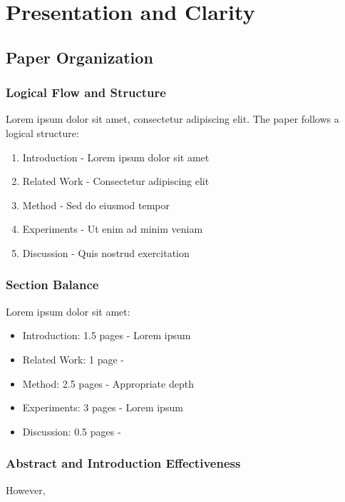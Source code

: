\section*{Presentation and Clarity}
\label{sec:presentation_clarity}

\subsection{Paper Organization}
\subsubsection{Logical Flow and Structure}
Lorem ipsum dolor sit amet, consectetur adipiscing elit. The paper follows a logical structure:
\begin{enumerate}
    \item Introduction - Lorem ipsum dolor sit amet
    \item Related Work - Consectetur adipiscing elit
    \item Method - Sed do eiusmod tempor
    \item Experiments - Ut enim ad minim veniam
    \item Discussion - Quis nostrud exercitation
\end{enumerate}


\subsubsection{Section Balance}
Lorem ipsum dolor sit amet:
\begin{itemize}
    \item Introduction: 1.5 pages - Lorem ipsum
    \item Related Work: 1 page - 
    \item Method: 2.5 pages - Appropriate depth
    \item Experiments: 3 pages - Lorem ipsum
    \item Discussion: 0.5 pages - 
\end{itemize}

\subsubsection{Abstract and Introduction Effectiveness}
 However, 

